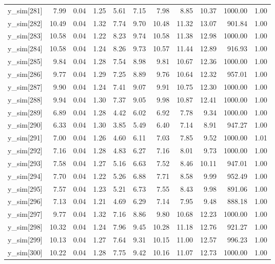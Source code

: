 \begin{table}[ht]
\begin{tabular}{rrrrrrrrrrr}
  y\_sim[281] & 7.99 & 0.04 & 1.25 & 5.61 & 7.15 & 7.98 & 8.85 & 10.37 & 1000.00 & 1.00 \\ 
  y\_sim[282] & 10.49 & 0.04 & 1.32 & 7.74 & 9.70 & 10.48 & 11.32 & 13.07 & 901.84 & 1.00 \\ 
  y\_sim[283] & 10.58 & 0.04 & 1.22 & 8.23 & 9.74 & 10.58 & 11.38 & 12.98 & 1000.00 & 1.00 \\ 
  y\_sim[284] & 10.58 & 0.04 & 1.24 & 8.26 & 9.73 & 10.57 & 11.44 & 12.89 & 916.93 & 1.00 \\ 
  y\_sim[285] & 9.84 & 0.04 & 1.28 & 7.54 & 8.98 & 9.81 & 10.67 & 12.36 & 1000.00 & 1.00 \\ 
  y\_sim[286] & 9.77 & 0.04 & 1.29 & 7.25 & 8.89 & 9.76 & 10.64 & 12.32 & 957.01 & 1.00 \\ 
  y\_sim[287] & 9.90 & 0.04 & 1.24 & 7.41 & 9.07 & 9.91 & 10.75 & 12.30 & 1000.00 & 1.00 \\ 
  y\_sim[288] & 9.94 & 0.04 & 1.30 & 7.37 & 9.05 & 9.98 & 10.87 & 12.41 & 1000.00 & 1.00 \\ 
  y\_sim[289] & 6.89 & 0.04 & 1.28 & 4.42 & 6.02 & 6.92 & 7.78 & 9.34 & 1000.00 & 1.00 \\ 
  y\_sim[290] & 6.33 & 0.04 & 1.30 & 3.85 & 5.49 & 6.40 & 7.14 & 8.91 & 947.27 & 1.00 \\ 
  y\_sim[291] & 7.00 & 0.04 & 1.26 & 4.60 & 6.11 & 7.03 & 7.85 & 9.52 & 1000.00 & 1.01 \\ 
  y\_sim[292] & 7.16 & 0.04 & 1.28 & 4.83 & 6.27 & 7.16 & 8.01 & 9.73 & 1000.00 & 1.00 \\ 
  y\_sim[293] & 7.58 & 0.04 & 1.27 & 5.16 & 6.63 & 7.52 & 8.46 & 10.11 & 947.01 & 1.00 \\ 
  y\_sim[294] & 7.70 & 0.04 & 1.22 & 5.26 & 6.88 & 7.71 & 8.58 & 9.99 & 952.49 & 1.00 \\ 
  y\_sim[295] & 7.57 & 0.04 & 1.23 & 5.21 & 6.73 & 7.55 & 8.43 & 9.98 & 891.06 & 1.00 \\ 
  y\_sim[296] & 7.13 & 0.04 & 1.21 & 4.69 & 6.29 & 7.14 & 7.95 & 9.48 & 888.18 & 1.00 \\ 
  y\_sim[297] & 9.77 & 0.04 & 1.32 & 7.16 & 8.86 & 9.80 & 10.68 & 12.23 & 1000.00 & 1.00 \\ 
  y\_sim[298] & 10.32 & 0.04 & 1.24 & 7.96 & 9.45 & 10.28 & 11.18 & 12.76 & 921.27 & 1.00 \\ 
  y\_sim[299] & 10.13 & 0.04 & 1.27 & 7.64 & 9.31 & 10.15 & 11.00 & 12.57 & 996.23 & 1.00 \\ 
  y\_sim[300] & 10.22 & 0.04 & 1.28 & 7.75 & 9.42 & 10.16 & 11.07 & 12.73 & 1000.00 & 1.00 \\ 

\end{tabular}
\end{table}
